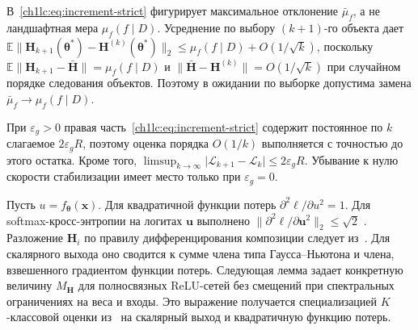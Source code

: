 \begin{remark}\label{ch1lc:rem:mu-bar}
В~\eqref{ch1lc:eq:increment-strict} фигурирует максимальное отклонение $\bar\mu_f$, а не ландшафтная мера $\mu_f(f\mid D)$.
Усреднение по выбору $(k+1)$-го объекта дает $\mathbb{E}\bigl\|\mathbf{H}_{k+1}(\boldsymbol{\theta}^*)-\mathbf{H}^{(k)}(\boldsymbol{\theta}^*)\bigr\|_2\le\mu_f(f\mid D)+O(1/\sqrt{k})$, поскольку $\mathbb{E}\bigl\|\mathbf{H}_{k+1}-\bar{\mathbf{H}}\bigr\|=\mu_f(f\mid D)$ и $\bigl\|\bar{\mathbf{H}}-\mathbf{H}^{(k)}\bigr\|=O(1/\sqrt{k})$ при случайном порядке следования объектов.
Поэтому в ожидании по выборке допустима замена $\bar\mu_f\to\mu_f(f\mid D)$.

При $\varepsilon_g>0$ правая часть~\eqref{ch1lc:eq:increment-strict} содержит постоянное по $k$ слагаемое $2\varepsilon_gR$, поэтому оценка порядка $O(1/k)$ выполняется с точностью до этого остатка.
Кроме того, $\limsup_{k\to\infty}\bigl|\mathcal{L}_{k+1}-\mathcal{L}_k\bigr|\le 2\varepsilon_gR$.
Убывание к нулю скорости стабилизации имеет место только при $\varepsilon_g=0$.
\end{remark}


Пусть $u=f_{\boldsymbol{\theta}}(\mathbf{x})$. Для квадратичной функции потерь $\partial^2 \ell/\partial u^2=1$. Для softmax-кросс-энтропии на логитах $\mathbf{u}$ выполнено $\|\partial^2 \ell/\partial \mathbf{u}^2\|_2\le\sqrt{2}$
\cite{grabovoi2024unraveling748584228}.
Разложение $\mathbf{H}_i$ по правилу дифференцирования композиции следует из~\cite[раздел~3.4]{grabovoi2024unraveling748584228}. Для скалярного выхода оно сводится к сумме члена типа Гаусса--Ньютона и члена, взвешенного градиентом функции потерь.
Следующая лемма задает конкретную величину $M_{\mathbf{H}}$ для полносвязных ReLU-сетей без смещений при спектральных ограничениях на веса и входы. Это выражение получается специализацией $K$-классовой оценки из~\cite[теорема~1]{grabovoi2024unraveling748584228} на скалярный выход и квадратичную функцию потерь.

